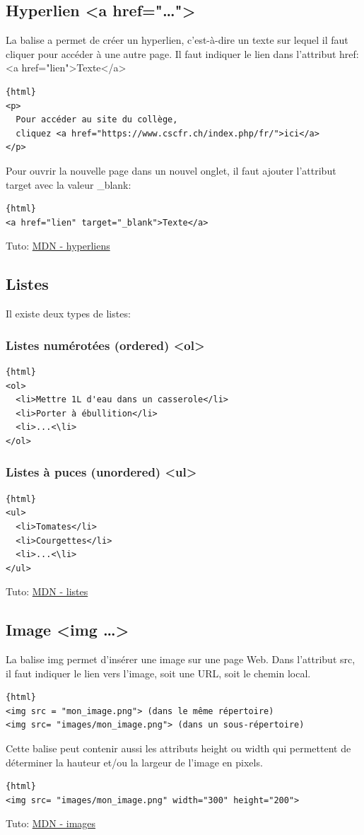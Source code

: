 \documentclass[a4paper,11pt]{article}
\begin{document}
\subsection{Hyperlien <a href="\dots">}
La balise a permet de créer un  hyperlien, c'est-à-dire un texte sur lequel il faut cliquer pour accéder à une autre page. Il faut indiquer le lien dans l'attribut href:
<a href="lien">Texte</a>
\begin{verbatim}{html}
<p>
  Pour accéder au site du collège,
  cliquez <a href="https://www.cscfr.ch/index.php/fr/">ici</a>
</p>
\end{verbatim}
Pour ouvrir la nouvelle page dans un nouvel onglet, il faut ajouter l'attribut target avec la valeur \_blank:
\begin{verbatim}{html}
<a href="lien" target="_blank">Texte</a>
\end{verbatim}
Tuto: \href{https://developer.mozilla.org/fr/docs/Web/HTML/Element/a}{MDN - hyperliens}

\subsection{Listes}
Il existe deux types de listes:
\subsubsection{Listes numérotées (ordered) <ol>}
\begin{verbatim}{html}
<ol>
  <li>Mettre 1L d'eau dans un casserole</li>
  <li>Porter à ébullition</li>
  <li>...<\li>
</ol>
\end{verbatim}

\subsubsection{Listes à puces (unordered) <ul>}
\begin{verbatim}{html}
<ul>
  <li>Tomates</li>
  <li>Courgettes</li>
  <li>...<\li>
</ul>
\end{verbatim}
Tuto: \href{https://developer.mozilla.org/fr/docs/Web/HTML/Element/li}{MDN - listes}

\subsection{Image <img \dots>}
La balise img permet d'insérer une image sur une page Web. Dans l'attribut src, il faut indiquer le lien vers l'image, soit une URL, soit le chemin local.
\begin{verbatim}{html}
<img src = "mon_image.png"> (dans le même répertoire)
<img src= "images/mon_image.png"> (dans un sous-répertoire)
\end{verbatim}
Cette balise peut contenir aussi les attributs height ou width qui permettent de déterminer la hauteur et/ou la largeur de l'image en pixels.
\begin{verbatim}{html}
<img src= "images/mon_image.png" width="300" height="200">
\end{verbatim}
Tuto: \href{https://developer.mozilla.org/fr/docs/Learn/HTML/Multimedia_and_embedding/Images_in_HTML}{MDN - images}
\end{document}
